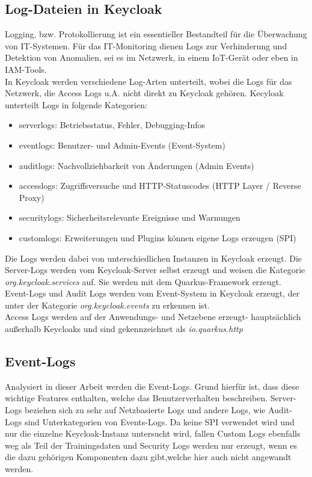 \documentclass[a4paper,12pt]{article}
\begin{document}
	\subsection{Log-Dateien in Keycloak}
	Logging, bzw. Protokollierung ist ein essentieller Bestandteil für die Überwachung von IT-Systemen. Für das IT-Monitoring dienen Logs zur Verhinderung und Detektion von Anomalien, sei es im Netzwerk, in einem IoT-Gerät oder eben in IAM-Tools. 
	\\[0.5em]
	In Keycloak werden verschiedene Log-Arten unterteilt, wobei die Logs für das Netzwerk, die Access Logs u.A. nicht direkt zu Keycloak gehören.
	Kecyloak unterteilt Logs in folgende Kategorien:
	\begin{itemize}
		\item \gls{serverlogs}: Betriebsstatus, Fehler, Debugging-Infos
		\item \gls{eventlogs}: Benutzer- und Admin-Events (Event-System)
		\item \gls{auditlogs}: Nachvollziehbarkeit von Änderungen (Admin Events)
		\item \gls{accesslogs}: Zugriffsversuche und HTTP-Statuscodes (HTTP Layer / Reverse Proxy)
		\item \gls{securitylogs}: Sicherheitsrelevante Ereignisse und Warnungen
		\item \gls{customlogs}: Erweiterungen und Plugins können eigene Logs erzeugen (SPI)
	\end{itemize}
	Die Logs werden dabei von unterschiedlichen Instanzen in Keycloak erzeugt. Die Server-Logs werden  vom Keycloak-Server selbst erzeugt und weisen die Kategorie \textit{org.keycloak.services} auf. Sie werden mit dem Quarkus-Framework erzeugt.
	\\[0.5em]
	Event-Logs und Audit Logs werden vom Event-System in Keycloak erzeugt, der unter der Kategorie \textit{org.keycloak.events} zu erkennen ist.
	\\[0.5em]
	Access Logs werden auf der Anwendungs- und Netzebene erzeugt- hauptsächlich außerhalb Keycloaks und sind gekennzeichnet als \textit{io.quarkus.http}
	\\[0.5em]
	
	\subsection{Event-Logs}
	Analysiert in dieser Arbeit werden die Event-Logs. Grund hierfür ist, dass diese wichtige Features enthalten, welche das Benutzerverhalten beschreiben. Server-Logs beziehen sich zu sehr auf Netzbasierte Logs und andere Logs, wie Audit-Logs sind Unterkategorien von Events-Logs. Da keine SPI verwendet wird und nur die einzelne Keycloak-Instanz untersucht wird, fallen Custom Logs ebenfalls weg als Teil der Trainingsdaten und Security Logs werden nur erzeugt, wenn es die dazu gehörigen Komponenten dazu gibt,welche hier auch nicht angewandt werden.
	\\[0.5em]
	
\end{document}

